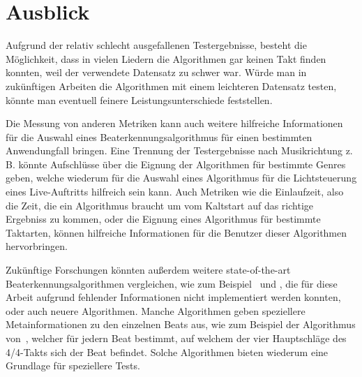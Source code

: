 \section{Ausblick}
{
	Aufgrund der relativ schlecht ausgefallenen Testergebnisse,
		besteht die Möglichkeit,
		dass in vielen Liedern die Algorithmen gar keinen Takt finden konnten,
		weil der verwendete Datensatz zu schwer war.
	Würde man in zukünftigen Arbeiten die Algorithmen mit einem leichteren Datensatz testen,
		könnte man eventuell feinere Leistungsunterschiede feststellen.

	Die Messung von anderen Metriken kann auch weitere hilfreiche Informationen für die Auswahl eines Beaterkennungsalgorithmus für einen bestimmten Anwendungfall bringen.
	Eine Trennung der Testergebnisse nach Musikrichtung z. B. könnte Aufschlüsse über die Eignung der Algorithmen für bestimmte Genres geben,
		welche wiederum für die Auswahl eines Algorithmus für die Lichtsteuerung eines Live-Auftritts hilfreich sein kann.
	Auch Metriken wie die Einlaufzeit,
		also die Zeit,
		die ein Algorithmus braucht um vom Kaltstart auf das richtige Ergebniss zu kommen,
		oder die Eignung eines Algorithmus für bestimmte Taktarten,
		können hilfreiche Informationen für die Benutzer dieser Algorithmen hervorbringen.

	Zukünftige Forschungen könnten au{\ss}erdem weitere state-of-the-art Beaterkennungsalgorithmen vergleichen,
		wie zum Beispiel~\cite{2000_Di} und \cite{2001_Go},
		die für diese Arbeit aufgrund fehlender Informationen nicht implementiert werden konnten,
		oder auch neuere Algorithmen.
	Manche Algorithmen geben speziellere Metainformationen zu den einzelnen Beats aus,
		wie zum Beispiel der Algorithmus von~\cite{2001_Go},
		welcher für jedern Beat bestimmt,
		auf welchem der vier Hauptschläge des 4/4-Takts sich der Beat befindet.
	Solche Algorithmen bieten wiederum eine Grundlage für speziellere Tests.
}
